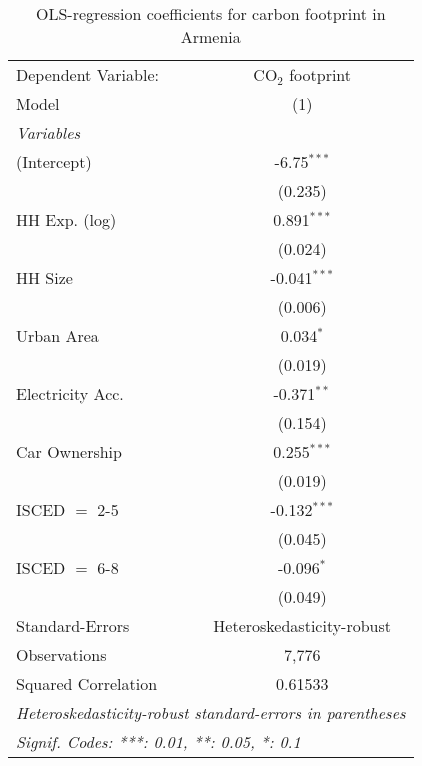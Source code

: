 
\begin{table}[htbp!]
   \centering
   \small
   \begin{adjustbox}{width = 1\textwidth, max height = 0.95\textheight, center}
      \begin{threeparttable}[b]
         \caption{\label{tab:OLS_2_ARM} OLS-regression coefficients for carbon footprint in Armenia}
         \begin{tabular}{lc}
            \tabularnewline \midrule \midrule
            Dependent Variable: & CO$_{2}$ footprint\\  
            Model               & (1)\\  
            \midrule
            \emph{Variables}\\
            (Intercept)         & -6.75$^{***}$\\   
                                & (0.235)\\   
            HH Exp. (log)       & 0.891$^{***}$\\   
                                & (0.024)\\   
            HH Size             & -0.041$^{***}$\\   
                                & (0.006)\\   
            Urban Area          & 0.034$^{*}$\\   
                                & (0.019)\\   
            Electricity Acc.    & -0.371$^{**}$\\   
                                & (0.154)\\   
            Car Ownership       & 0.255$^{***}$\\   
                                & (0.019)\\   
            ISCED $=$ 2-5       & -0.132$^{***}$\\   
                                & (0.045)\\   
            ISCED $=$ 6-8       & -0.096$^{*}$\\   
                                & (0.049)\\   
            \midrule 
            Standard-Errors     & Heteroskedasticity-robust \\   
            Observations        & 7,776\\  
            Squared Correlation & 0.61533\\  
            \midrule \midrule
            \multicolumn{2}{l}{\emph{Heteroskedasticity-robust standard-errors in parentheses}}\\
            \multicolumn{2}{l}{\emph{Signif. Codes: ***: 0.01, **: 0.05, *: 0.1}}\\
         \end{tabular}
         

\end{threeparttable}
\end{adjustbox}
\end{table}
